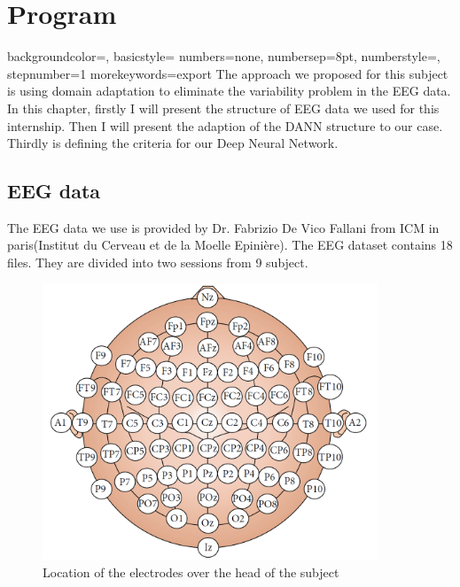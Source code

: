 
\chapter{Program} %

\label{Chapter4} %

{
	backgroundcolor=\color{black},
	basicstyle=\scriptsize\color{white}\ttfamily
	numbers=none,
	numbersep=8pt,                   %
	numberstyle=\tiny\color{white}, %
	stepnumber=1                    %
}
{
	morekeywords={export}
}
The approach we proposed for this subject is using domain adaptation to eliminate the variability problem in the EEG data. In this chapter, firstly I will present the structure of EEG data we used for this internship. Then I will present the adaption of the DANN structure to our case. Thirdly is defining the criteria for our Deep Neural Network.
\section{EEG data}
The EEG data we use is provided by Dr. Fabrizio De Vico Fallani from ICM in paris(Institut du Cerveau et de la Moelle Epinière). The EEG dataset contains 18 files. They are divided into two sessions from 9 subject. 

\begin{figure}[htbp]
	\centering
	\includegraphics[width=10cm]{Figures/eegcollect.png}
	\caption[Location of the electrodes over the head of the subject]{Location of the electrodes over the head of the subject}
	\label{fig:eegcollect}
\end{figure}

